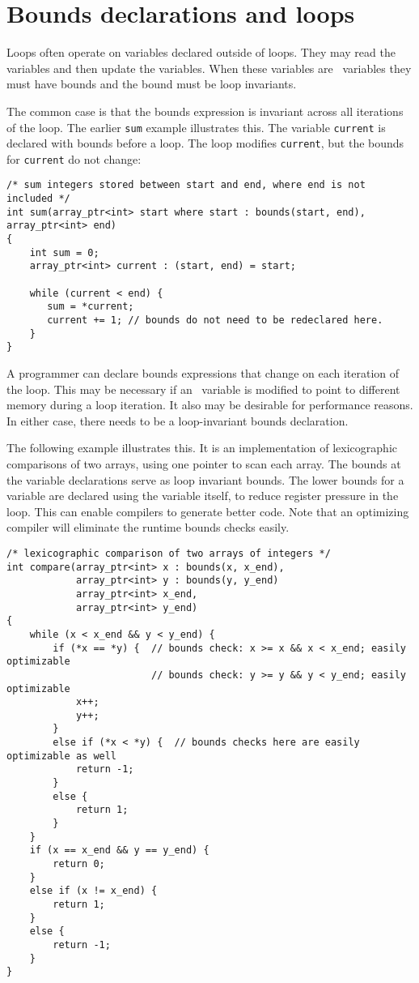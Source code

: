 \section{Bounds declarations and loops}

Loops often operate on variables declared outside of loops. They may
read the variables and then update the variables. When these variables
are \arrayptr\ variables they must have bounds and the bound
must be loop invariants.

The common case is that the bounds expression is invariant across all
iterations of the loop. The earlier \texttt{sum} example illustrates
this. The variable \texttt{current} is declared with bounds before a
loop. The loop modifies \texttt{current}, but the bounds for
\texttt{current} do not change:

\begin{verbatim}
/* sum integers stored between start and end, where end is not included */
int sum(array_ptr<int> start where start : bounds(start, end), array_ptr<int> end)
{ 
    int sum = 0;
    array_ptr<int> current : (start, end) = start;

    while (current < end) {
       sum = *current;
       current += 1; // bounds do not need to be redeclared here.
    }
}
\end{verbatim}

A programmer can declare bounds expressions that change on each
iteration of the loop. This may be necessary if an \arrayptr\
variable is modified to point to different memory during a loop
iteration. It also may be desirable for performance reasons. In either
case, there needs to be a loop-invariant bounds declaration.

The following example illustrates this. It is an implementation of
lexicographic comparisons of two arrays, using one pointer to scan each
array. The bounds at the variable declarations serve as loop invariant
bounds. The lower bounds for a variable are declared using the variable
itself, to reduce register pressure in the loop. This can enable
compilers to generate better code. Note that an optimizing compiler will
eliminate the runtime bounds checks easily.

\begin{verbatim}
/* lexicographic comparison of two arrays of integers */
int compare(array_ptr<int> x : bounds(x, x_end), 
            array_ptr<int> y : bounds(y, y_end)
            array_ptr<int> x_end,
            array_ptr<int> y_end)
{ 
    while (x < x_end && y < y_end) {
        if (*x == *y) {  // bounds check: x >= x && x < x_end; easily optimizable
                         // bounds check: y >= y && y < y_end; easily optimizable
            x++;
            y++;
        }
        else if (*x < *y) {  // bounds checks here are easily optimizable as well
            return -1;
        }
        else {
            return 1;
        }
    }
    if (x == x_end && y == y_end) {
        return 0;
    }
    else if (x != x_end) {
        return 1;
    }
    else {
        return -1; 
    }
}
\end{verbatim}

